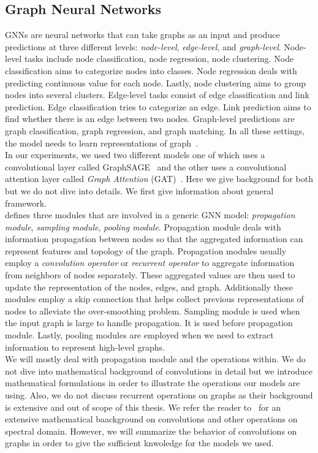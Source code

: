 \subsection{Graph Neural Networks}
\label{subsec:mixedApproaches_GraphNeuralNetworks}
GNNs are neural networks that can take graphs as an input and produce predictions at three different levels:
\emph{node-level}, \emph{edge-level}, and \emph{graph-level}. Node-level tasks include node classification, node
regression, node clustering. Node classification aims to categorize nodes into classes. Node regression deals with
predicting continuous value for each node. Lastly, node clustering aims to group nodes into several clusters. Edge-level tasks consist of edge classification and link prediction. Edge classification tries to categorize an edge. Link prediction aims to find whether there is an edge between two nodes. Graph-level predictions are graph classification, graph regression, and graph matching. In all these settings, the model needs to learn representations of graph~\parencite{GNNsAReview_Zhou}.\\
In our experiments, we used two different models one of which uses a convolutional layer called GraphSAGE~\parencite{GraphSAGE_Hamilton} and the other uses a convolutional attention layer called \emph{Graph Attention} (GAT)~\parencite{GraphAttentionNetworks_Velickovic}. Here we give background for both but we do not dive into details. We first give information about general framework.\\
\cite{GNNsAReview_Zhou} defines three modules that are involved in a generic GNN model: \emph{propagation module}, \emph{sampling module}, \emph{pooling module}. Propagation module deals with information propagation between nodes so that the aggregated information can represent features and topology of the graph. Propagation modules usually employ a \emph{convolution operator} or \emph{recurrent operator} to aggregate information from neighbors of nodes separately. These aggregated values are then used to update the representation of the nodes, edges, and graph. Additionally these modules employ a skip connection that helps collect previous representations of nodes to alleviate the over-smoothing problem. Sampling module is used when the input graph is large to handle propagation. It is used before propagation module. Lastly, pooling modules are employed when we need to extract information to represent high-level graphs.\\
We will mostly deal with propagation module and the operations within. We do not dive into mathematical background of convolutions in detail but we introduce mathematical formulations in order to illustrate the operations our models are using. Also, we do not discuss recurrent operations on graphs as their background is extensive and out of scope of this thesis. We refer the reader to~\cite{GNNsAReview_Zhou} for an extensive mathematical baackground on convolutions and other operations on spectral domain. However, we will summarize the behavior of convolutions on graphs in order to give the sufficient knwoledge for the models we used.\\
